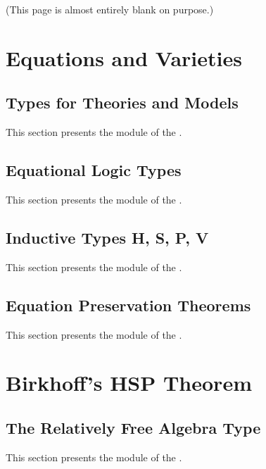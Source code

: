 \documentclass[a4paper,UKenglish,cleveref, autoref, thm-restate]{lipics-v2021}
\begin{document}
\begin{center}
  (This page is almost entirely blank on purpose.)
\end{center}

\newpage

\section{Equations and Varieties}
\label{sec:equations-and-varieties}

\subsection{Types for Theories and Models}\label{sec:types-for-theories-and-models}
This section presents the \ualibModelTheory module of  the \agdaualib.


\subsection{Equational Logic Types}\label{sec:equational-logic-types}
This section presents the \ualibEquationalLogic module of  the \agdaualib.


\subsection{Inductive Types H, S, P, V}\label{sec:inductive-types-h-s-p-v}
This section presents the \ualibVarietiesVarieties module of the \agdaualib.


\subsection{Equation Preservation Theorems}\label{sec:equation-preservation-theorems}
This section presents the \ualibPreservation module of  the \agdaualib.


\newpage

\section{Birkhoff's HSP Theorem}
\label{sec:birkhoff}

\subsection{The Relatively Free Algebra Type}\label{sec:relatively-free-algebra-type}
This section presents the \ualibFreeAlgebra module of  the \agdaualib.

\end{document}
